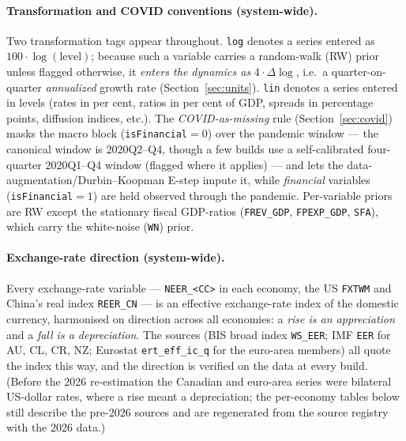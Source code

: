 \paragraph{Transformation and COVID conventions (system-wide).} Two
transformation tags appear throughout. \texttt{log} denotes a series entered
as $100\cdot\log(\text{level})$; because such a variable carries a random-walk
(RW) prior unless flagged otherwise, it \emph{enters the dynamics as}
$4\cdot\Delta\!\log$, i.e.\ a quarter-on-quarter \emph{annualized} growth rate
(Section~\ref{sec:units}). \texttt{lin} denotes a series entered in levels
(rates in per cent, ratios in per cent of GDP, spreads in percentage points,
diffusion indices, etc.). The \emph{COVID-as-missing} rule
(Section~\ref{sec:covid}) masks the macro block (\texttt{isFinancial}$=0$)
over the pandemic window --- the canonical window is 2020Q2--Q4, though a few
builds use a self-calibrated four-quarter 2020Q1--Q4 window (flagged where it
applies) --- and lets the data-augmentation/Durbin--Koopman E-step impute it,
while \emph{financial} variables (\texttt{isFinancial}$=1$) are held observed
through the pandemic. Per-variable priors are RW except the stationary fiscal
GDP-ratios (\texttt{FREV\_GDP}, \texttt{FPEXP\_GDP}, \texttt{SFA}), which carry
the white-noise (\texttt{WN}) prior.

\paragraph{Exchange-rate direction (system-wide).} Every exchange-rate variable --- \texttt{NEER\_<CC>} in each
economy, the US \texttt{FXTWM} and China's real index \texttt{REER\_CN} --- is an effective exchange-rate index of
the domestic currency, harmonised on direction across all economies: a \emph{rise is an appreciation} and a
\emph{fall is a depreciation}. The sources (BIS broad index \texttt{WS\_EER}; IMF \texttt{EER} for AU, CL, CR, NZ;
Eurostat \texttt{ert\_eff\_ic\_q} for the euro-area members) all quote the index this way, and the direction is
verified on the data at every build. (Before the 2026 re-estimation the Canadian and euro-area series were
bilateral US-dollar rates, where a rise meant a depreciation; the per-economy tables below still describe the
pre-2026 sources and are regenerated from the source registry with the 2026 data.)

